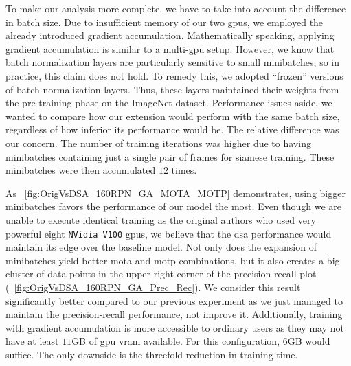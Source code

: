 To make our analysis more complete, we have to take into account the difference in batch size. Due to insufficient memory of our two \glspl{gpu}, we employed the already introduced gradient accumulation. Mathematically speaking, applying gradient accumulation is similar to a multi-\gls{gpu} setup. However, we know that batch normalization layers are particularly sensitive to small minibatches, so in practice, this claim does not hold. To remedy this, we adopted ``frozen'' versions of batch normalization layers. Thus, these layers maintained their weights from the pre-training phase on the ImageNet dataset. Performance issues aside, we wanted to compare how our extension would perform with the same batch size, regardless of how inferior its performance would be. The relative difference was our concern. The number of training iterations was higher due to having minibatches containing just a single pair of frames for siamese training. These minibatches were then accumulated $12$ times.

As \figtext{}~\ref{fig:OrigVsDSA_160RPN_GA_MOTA_MOTP} demonstrates, using bigger minibatches favors the performance of our model the most. Even though we are unable to execute identical training as the original authors who used very powerful eight \texttt{NVidia V100} \glspl{gpu}, we believe that the \gls{dsa} performance would maintain its edge over the baseline model. Not only does the expansion of minibatches yield better \gls{mota} and \gls{motp} combinations, but it also creates a big cluster of data points in the upper right corner of the precision-recall plot (\figtext{}~\ref{fig:OrigVsDSA_160RPN_GA_Prec_Rec}). We consider this result significantly better compared to our previous experiment as we just managed to maintain the precision-recall performance, not improve it. Additionally, training with gradient accumulation is more accessible to ordinary users as they may not have at least $11$GB of \gls{gpu} \gls{vram} available. For this configuration, $6$GB would suffice. The only downside is the threefold reduction in training time.

